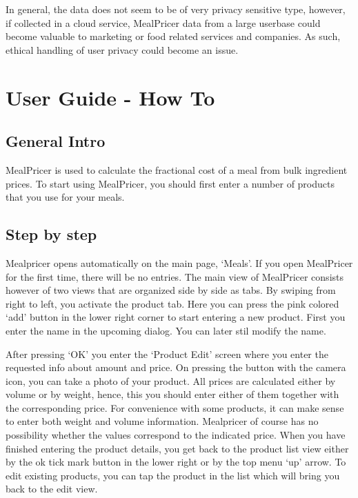 \documentclass[a4paper,11pt,twoside]{article}
\begin{document}
In general, the data does not seem to be of very privacy sensitive type, however,
if collected in a cloud service, MealPricer data from a large userbase
could become valuable to marketing or food related services and companies. As such,
ethical handling of user privacy could become an issue.


\section{User Guide - How To}
\subsection{General Intro}
MealPricer is used to calculate the fractional cost of a meal from bulk
ingredient prices. To start using MealPricer, you should first enter a number
of products that you use for your meals.

\subsection{Step by step}
Mealpricer opens automatically on the main page, `Meals'. If you open MealPricer
for the first time, there will be no entries. The main view of MealPricer
consists however of two views that are organized side by side as tabs. By
swiping from right to left, you activate the product tab. Here you can press
the pink colored `add'  button in the lower right corner to start entering a new
product. First you enter the name in the upcoming dialog. You can later stil
modify the name.

After pressing `OK' you enter the `Product Edit' screen where
you enter the requested info about amount and price. On pressing the button with
the camera icon, you can take a photo of your product. All prices are calculated
either by volume or by weight, hence, this you should enter either of them together
with the corresponding price. For convenience with some products, it can make
sense to enter both weight and volume information. Mealpricer of course has no
possibility whether the values correspond to the indicated price. When you have
finished entering the product details, you get back to the product list view
either by the ok tick mark button in the lower right or by the top menu `up'
arrow. To edit existing products, you can tap the product in the list which
will bring you back to the edit view.
\end{document}
